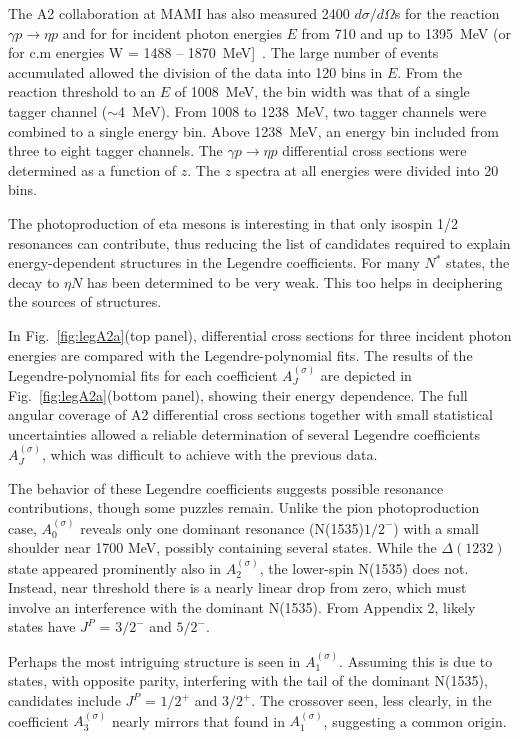 \documentclass[prc,reprint,onecolumn,amsmath,amssymb,superscriptaddress]{revtex4-1}
\begin{document}
The A2 collaboration at MAMI has also measured
2400 $d\sigma/d\Omega$s for the reaction $\gamma p\to\eta p$ and
for for incident photon energies $E$ from 710 and up to 1395~MeV
(or for c.m energies W = 1488 -- 1870~MeV]~\cite{CBC}. The large
number of events accumulated allowed the division of the data
into 120 bins in $E$. From the reaction threshold to an $E$ of
1008~MeV, the bin width was that of a single tagger channel
($\sim$4~MeV). From 1008 to 1238~MeV, two tagger channels were
combined to a single energy bin.  Above 1238~MeV, an energy bin
included from three to eight tagger channels. The $\gamma p\to\eta 
p$ differential cross sections were determined as a function of
$z$. The $z$ spectra at all energies were divided into 20 bins.

The photoproduction of eta mesons is interesting in that only
isospin 1/2 resonances can contribute, thus reducing the list
of candidates required to explain energy-dependent structures in
the Legendre coefficients. For many $N^*$ states, the decay to
$\eta N$ has been determined to be very weak. This too helps
in deciphering the sources of structures. 

In Fig.~\ref{fig:legA2a}(top panel), differential cross sections
for three incident photon energies are compared with the
Legendre-polynomial fits.  The results of the Legendre-polynomial
fits for each coefficient $A^{(\sigma)}_J$ are depicted in
Fig.~\ref{fig:legA2a}(bottom panel), showing their energy
dependence.  The full angular coverage of A2 differential cross
sections together with small statistical uncertainties allowed
a reliable determination of several Legendre coefficients
$A^{(\sigma)}_J$, which was difficult to achieve with the previous
data. 

The behavior of these Legendre coefficients suggests possible
resonance contributions, though some puzzles remain. Unlike the
pion photoproduction case, $A^{(\sigma)}_0$ reveals only one dominant
resonance (N(1535)$1/2^-$) with a small shoulder near 1700 MeV,
possibly containing several states. While the $\Delta (1232)$ state
appeared prominently also in $A^{(\sigma)}_2$, the lower-spin 
N(1535) does not. Instead, near threshold there is a nearly linear
drop from zero, which must involve an interference with the dominant
N(1535). From Appendix 2, likely states have $J^P$ = $3/2^-$  
and $5/2^-$.

Perhaps the most intriguing structure is seen in $A^{(\sigma)}_1$. 
Assuming this is due to states, with opposite parity, interfering
with the tail of the dominant N(1535), candidates include
$J^P$ = $1/2^+$ and $3/2^+$. The crossover seen, less
clearly, in the coefficient $A^{(\sigma)}_3$ nearly mirrors that
found in $A^{(\sigma)}_1$, suggesting a common origin. 
\end{document}
